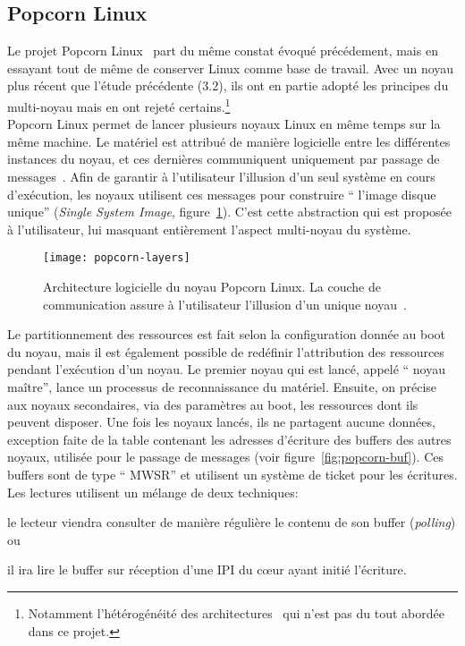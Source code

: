       
    \subsection{Popcorn Linux}

      Le projet Popcorn Linux~\citep{barbalacepopcorn} part du même constat
      évoqué précédement, mais en essayant tout de même de conserver Linux comme
      base de travail. Avec un noyau plus récent que l'étude précédente (3.2),
      ils ont en partie adopté les principes du multi-noyau mais en ont rejeté
      certains.\footnote{Notamment l'hétérogénéité des
        architectures~\citep{schupbach2008embracing} qui n'est pas du tout
        abordée dans ce projet.}\\

      Popcorn Linux permet de lancer plusieurs noyaux Linux en même temps sur la
      même machine. Le matériel est attribué de manière logicielle entre les
      différentes instances du noyau, et ces dernières communiquent uniquement
      par passage de messages~\citep{shelton2013popcorn}. Afin de garantir à
      l’utilisateur l’illusion d’un seul système en cours d'exécution, les
      noyaux utilisent ces messages pour construire `` l’image disque unique''
      (\textit{Single System Image}, figure~\ref{fig:popcorn-layers}). C'est
      cette abstraction qui est proposée à l'utilisateur, lui masquant
      entièrement l'aspect multi-noyau du système.

      \begin{figure}[ht]
        \centering
        \texttt{[image: popcorn-layers]}
        \caption{Architecture logicielle du noyau Popcorn Linux. La couche de
          communication assure à l'utilisateur l'illusion d'un unique
          noyau~\citep{barbalacepopcorn}.}
        \label{fig:popcorn-layers}
      \end{figure}

      Le partitionnement des ressources est fait selon la configuration donnée
      au boot du noyau, mais il est également possible de redéfinir
      l'attribution des ressources pendant l'exécution d'un noyau. Le premier
      noyau qui est lancé, appelé `` noyau maître'', lance un processus de
      reconnaissance du matériel. Ensuite, on précise aux noyaux secondaires,
      via des paramètres au boot, les ressources dont ils peuvent disposer. Une
      fois les noyaux lancés, ils ne partagent aucune données, exception faite
      de la table contenant les adresses d’écriture des buffers des autres
      noyaux, utilisée pour le passage de messages (voir
      figure~\ref{fig:popcorn-buf}). Ces buffers sont de type ``
      MWSR'' et utilisent un
      système de ticket pour les écritures. Les lectures utilisent un mélange de
      deux techniques:\benumline \item le lecteur viendra consulter de manière
      régulière le contenu de son buffer (\textit{polling}) ou \item il ira lire
      le buffer sur réception d’une IPI du c\oe ur ayant initié l’écriture\eenumline.

